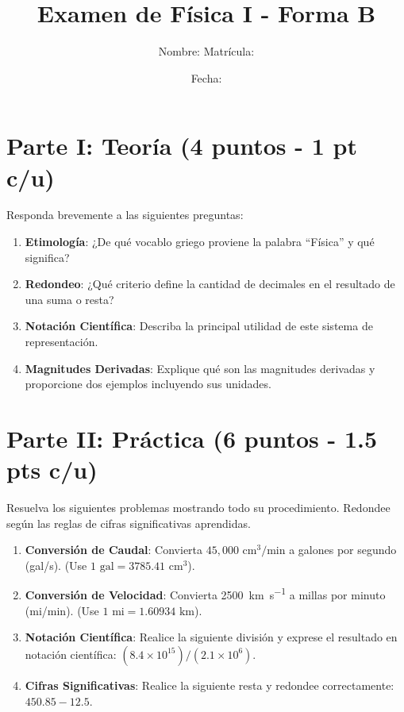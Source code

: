 \documentclass[a4paper,12pt]{article}
\title{Examen de Física I - Forma B}
\author{Nombre: \underline{\hspace{8cm}} \quad Matrícula: \underline{\hspace{3cm}}}
\date{Fecha: \underline{\hspace{4cm}}}
\begin{document}
\maketitle

\section{Parte I: Teoría (4 puntos - 1 pt c/u)}
Responda brevemente a las siguientes preguntas:

\begin{enumerate}[itemsep=2em]
    \item \textbf{Etimología}: ¿De qué vocablo griego proviene la palabra ``Física'' y qué significa?
    \item \textbf{Redondeo}: ¿Qué criterio define la cantidad de decimales en el resultado de una suma o resta?
    \item \textbf{Notación Científica}: Describa la principal utilidad de este sistema de representación.
    \item \textbf{Magnitudes Derivadas}: Explique qué son las magnitudes derivadas y proporcione dos ejemplos incluyendo sus unidades.
\end{enumerate}

\vspace{2cm}

\section{Parte II: Práctica (6 puntos - 1.5 pts c/u)}
Resuelva los siguientes problemas mostrando todo su procedimiento. Redondee según las reglas de cifras significativas aprendidas.

\begin{enumerate}[itemsep=4em]
    \item \textbf{Conversión de Caudal}: Convierta $45,000 \text{ cm}^3/\text{min}$ a galones por segundo (gal/s). (Use $1\text{ gal} = 3785.41\text{ cm}^3$).
    \item \textbf{Conversión de Velocidad}: Convierta \SI{2500}{\km\per\second} a millas por minuto (mi/min). (Use $1\text{ mi} = 1.60934\text{ km}$).
    \item \textbf{Notación Científica}: Realice la siguiente división y exprese el resultado en notación científica: $(8.4 \times 10^{15}) / (2.1 \times 10^6)$.
    \item \textbf{Cifras Significativas}: Realice la siguiente resta y redondee correctamente: $450.85 - 12.5$.
\end{enumerate}
\end{document}

